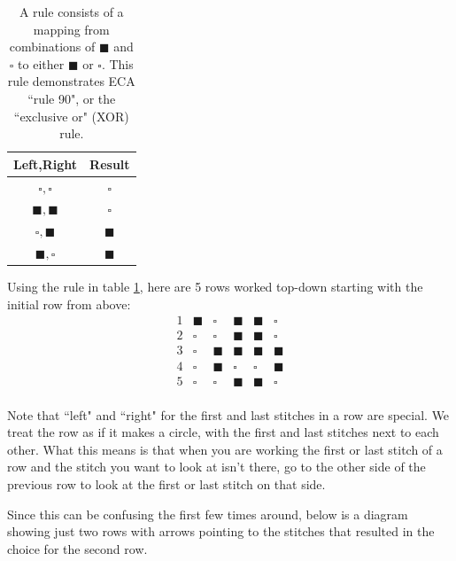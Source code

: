 \documentclass{../knittingpattern}
\newcommand{\K}{\blacksquare}
\renewcommand{\P}{\square}
\begin{document}
\begin{table}[h]
\begin{center}
\begin{tabular}{cc}
\hline
Left,Right & Result \\
\hline
$\P,\P$ & $\P$ \\
$\K,\K$ & $\P$ \\
$\P,\K$ & $\K$ \\
$\K,\P$ & $\K$ \\
\hline
\end{tabular}
\caption{\label{tab:rule90}A rule consists of a mapping from combinations of $\K$ and $\P$ to either $\K$ or $\P$. This rule demonstrates ECA ``rule 90", or the ``exclusive or" (XOR) rule.}
\end{center}
\end{table}


Using the rule in table \ref{tab:rule90}, here are 5 rows worked top-down starting with the initial row from above:
\[
\begin{matrix}
1 & \K & \P & \K & \K & \P \\
2 & \P & \P & \K & \K & \P \\
3 & \P & \K & \K & \K & \K \\
4 & \P & \K & \P & \P & \K \\
5 & \P & \P & \K & \K & \P \\
\end{matrix}
\]

Note that ``left" and ``right" for the first and last stitches in a row are special. We treat the row as if it makes a circle, with the first and last stitches next to each other. What this means is that when you are working the first or last stitch of a row and the stitch you want to look at isn't there, go to the other side of the previous row to look at the first or last stitch on that side.

Since this can be confusing the first few times around, below is a diagram showing just two rows with arrows pointing to the stitches that resulted in the choice for the second row.
\end{document}
